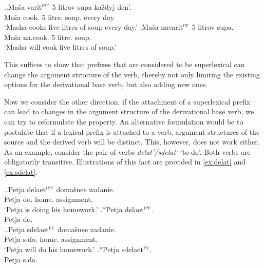 \ex.\label{ex:pref:navarit:3}\ag.\label{ex:varit3}Ma\v{s}a varit$^{\textsc{ipf}}$ 5 litrov supa ka\v{z}dyj den'.\\
Ma\v{s}a cook. 5 litre. soup. every day\\
\trans `Masha cooks five litres of soup every day.'
\bg.\label{ex:navarit3}Ma\v{s}a navarit$^{\textsc{pf}}$ 5 litrov supa.\\
Ma\v{s}a na.cook. 5 litre. soup.\\
\trans `Masha will cook five litres of soup.'

This suffices to show that prefixes that are considered to be superlexical can change the argument structure of the verb, thereby not only limiting the existing options for the derivational base verb, but also adding new ones.

Now we consider the other direction: if the attachment of a superlexical prefix  can lead to changes in the argument structure of the derivational base verb, we can try to reformulate the property. An alternative formulation would be to postulate that if a lexical prefix  is attached to a verb, argument structures of the source and the derived verb will be distinct. This, however, does not work either. As an example, consider the pair of verbs \textit{delat'/sdelat'} `to do'. Both verbs are obligatorily transitive. Illustrations of this fact are provided in \ref{ex:delat} and \ref{ex:sdelat}.

\ex.\label{ex:delat}\ag.Petja delaet$^{\textsc{ipf}}$ doma\v{s}nee zadanie.\\
Petja do. home. assignment.\\
\trans `Petja is doing his homework.'
\bg.*Petja delaet$^{\textsc{ipf}}$.\\
Petja do.\\

\ex.\label{ex:sdelat}\ag.Petja sdelaet$^{\textsc{pf}}$ doma\v{s}nee zadanie.\\
Petja s.do. home. assignment.\\
\trans `Petja will do his homework.'
\bg.*Petja sdelaet$^{\textsc{pf}}$.\\
Petja s.do.\\


